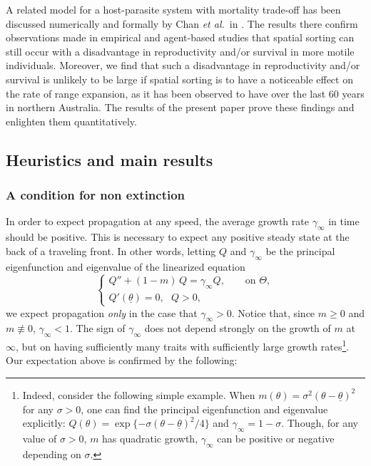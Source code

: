 \documentclass[11pt]{article}    %
\begin{document}
A related model for a host-parasite system with mortality trade-off has been discussed numerically and formally by Chan \textit{et al.}~in \cite{Chan}. The results there confirm  observations made in empirical and agent-based studies that spatial sorting can still occur with a disadvantage in reproductivity and/or survival in more motile individuals. Moreover, we find that such a disadvantage in reproductivity and/or survival is unlikely to be large if spatial sorting is to have a noticeable effect on the rate of range expansion, as it has been observed to have over the last 60 years in northern Australia. The results of the present paper prove these findings and enlighten them quantitatively.   



\subsection{Heuristics and main results}

\subsubsection*{A condition for non extinction} 

In order to expect propagation at any speed, the average growth rate $\gamma_\infty$ in time should be positive. This is necessary to expect any positive steady state at the back of a traveling front. In other words, letting $Q$ and $\gamma_\infty$ be the principal eigenfunction and eigenvalue of the linearized equation
\begin{equation}\label{eq:specQ}
\begin{cases}
Q'' +  (1 - m) \, Q  = \gamma_\infty Q, \qquad \text{on } \Theta,\\
Q'\left(\underline \theta \right) = 0,~~~ Q > 0,
\end{cases}
\end{equation}
we expect propagation {\em only} in the case that $\gamma_\infty>0$.  Notice that, since $m \geq 0$ and $m\not\equiv 0$, $\gamma_\infty < 1$.  The sign of $\gamma_\infty$ does not depend strongly on the growth of $m$ at $\infty$, but on having sufficiently many traits with sufficiently large growth rates\footnote{Indeed, consider the following simple example.  When $m(\theta) = \sigma^2 (\theta-\underline\theta)^2$ for any $\sigma>0$, one can find the principal eigenfunction and eigenvalue explicitly: $Q(\theta) = \exp\{- \sigma(\theta-\underline\theta)^2/4\}$ and $\gamma_\infty = 1-\sigma$.  Though, for any value of $\sigma>0$, $m$ has quadratic growth, $\gamma_\infty$ can be positive or negative depending on $\sigma$.}.  Our expectation above is confirmed by the following:
\end{document}
